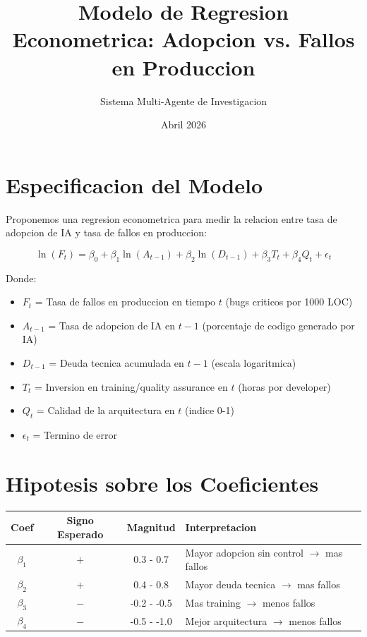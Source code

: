 \documentclass{article}
\title{Modelo de Regresion Econometrica: Adopcion vs. Fallos en Produccion}
\author{Sistema Multi-Agente de Investigacion}
\date{Abril 2026}
\begin{document}
\maketitle

\section{Especificacion del Modelo}

Proponemos una regresion econometrica para medir la relacion entre tasa de adopcion de IA y tasa de fallos en produccion:

\begin{equation}
\ln(F_t) = \beta_0 + \beta_1 \ln(A_{t-1}) + \beta_2 \ln(D_{t-1}) + \beta_3 T_t + \beta_4 Q_t + \epsilon_t
\end{equation}

Donde:
\begin{itemize}
    \item $F_t$ = Tasa de fallos en produccion en tiempo $t$ (bugs criticos por 1000 LOC)
    \item $A_{t-1}$ = Tasa de adopcion de IA en $t-1$ (porcentaje de codigo generado por IA)
    \item $D_{t-1}$ = Deuda tecnica acumulada en $t-1$ (escala logaritmica)
    \item $T_t$ = Inversion en training/quality assurance en $t$ (horas por developer)
    \item $Q_t$ = Calidad de la arquitectura en $t$ (indice 0-1)
    \item $\epsilon_t$ = Termino de error
\end{itemize}

\section{Hipotesis sobre los Coeficientes}

\begin{table}[h]
\centering
\begin{tabular}{|c|c|c|l|}
\hline
\textbf{Coef} & \textbf{Signo Esperado} & \textbf{Magnitud} & \textbf{Interpretacion} \\
\hline
$\beta_1$ & $+$ & 0.3 - 0.7 & Mayor adopcion sin control $\rightarrow$ mas fallos \\
$\beta_2$ & $+$ & 0.4 - 0.8 & Mayor deuda tecnica $\rightarrow$ mas fallos \\
$\beta_3$ & $-$ & -0.2 - -0.5 & Mas training $\rightarrow$ menos fallos \\
$\beta_4$ & $-$ & -0.5 - -1.0 & Mejor arquitectura $\rightarrow$ menos fallos \\
\hline
\end{tabular}
\end{table}
\end{document}
